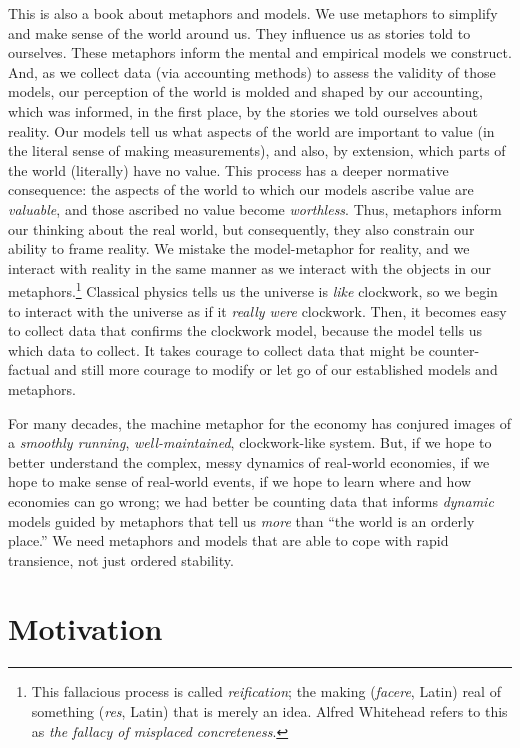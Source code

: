 % 
% 
This is also a book about metaphors and models.
We use metaphors to simplify and make sense of the world around us.
They influence us as stories told to ourselves.
These metaphors inform the mental and empirical models we construct.
And, as we collect data (via accounting methods) 
to assess the validity of those models,
our perception of the world is molded and shaped
by our accounting, which was informed, in the first place,
by the stories we told ourselves about reality.
Our models tell us what aspects of the world
are important to value 
(in the literal sense of making measurements),
and also, by extension, 
which parts of the world (literally) have no value.
This process has a deeper normative
consequence: the aspects of the world to which our models ascribe
value are \emph{valuable},
and those ascribed no value become \emph{worthless}.
Thus, metaphors inform our thinking about the real world,
but consequently,
they also constrain our ability to frame reality.
We mistake the model-metaphor for reality, and
we interact with reality in the same manner 
as we interact with the objects in our
metaphors.\footnote{This fallacious process is called
	\emph{reification}; the making (\emph{facere}, Latin) real of
	something (\emph{res}, Latin) that is merely an idea.
	Alfred Whitehead refers to this as
	\emph{the fallacy of misplaced concreteness}.\cite{Whitehead2011}}
Classical physics tells us the universe is
\emph{like} clockwork, 
so we begin to interact with the universe
as if it \emph{really were} clockwork.
Then, it becomes easy to collect data that confirms the clockwork model,
because the model tells us which data to collect.
It takes courage to collect data that might be counter-factual
and still more courage to modify 
or let go of our established models and metaphors.

For many decades, the machine metaphor for the economy
has conjured images of a \emph{smoothly running}, 
\emph{well-maintained}, clockwork-like system.
But, if we hope to better understand the complex, 
messy dynamics of real-world economies,
if we hope to make sense of real-world events, 
if we hope to learn where and how economies can go wrong;
we had better be counting data that informs \emph{dynamic} models
guided by metaphors that tell us \emph{more} than ``the world is an orderly place.''
We need metaphors and models that are
able to cope with rapid transience,
not just ordered stability.


\section{Motivation}
\label{sec:motivation}

